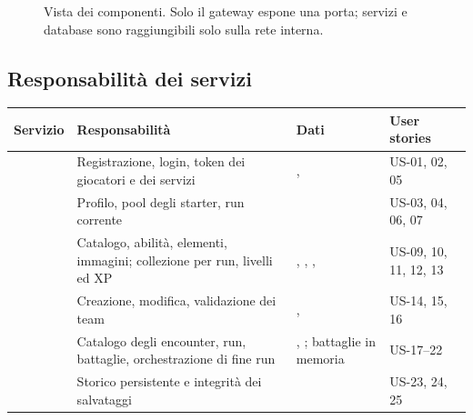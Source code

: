 \documentclass[11pt,a4paper]{article}
\begin{document}
\begin{figure}[htbp]
  \centering
  \begin{adjustbox}{max width=\linewidth}
  \end{adjustbox}
  \caption{Vista dei componenti. Solo il gateway espone una porta; servizi e database sono raggiungibili solo sulla rete interna.}
  \label{fig:componenti}
\end{figure}

\subsection{Responsabilità dei servizi}

{\small
\begin{tabularx}{\linewidth}{@{}L{2.1cm}YL{4.1cm}L{2.2cm}@{}}
  \toprule
  Servizio & Responsabilità & Dati & User stories \\
  \midrule
   & Registrazione, login, token dei giocatori e dei servizi & ,  & US-01, 02, 05 \\
   & Profilo, pool degli starter, run corrente &  & US-03, 04, 06, 07 \\
   & Catalogo, abilità, elementi, immagini; collezione per run, livelli ed XP & , , ,  & US-09, 10, 11, 12, 13 \\
   & Creazione, modifica, validazione dei team & ,  & US-14, 15, 16 \\
   & Catalogo degli encounter, run, battaglie, orchestrazione di fine run & , ; battaglie in memoria & US-17–22 \\
   & Storico persistente e integrità dei salvataggi &  & US-23, 24, 25 \\
  \bottomrule
\end{tabularx}}
\end{document}
